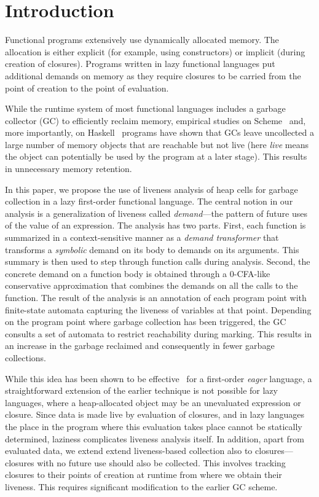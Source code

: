 \documentclass[9pt]{sigplanconf}
\begin{document}
\section{Introduction}
\label{sec:intro}

Functional programs extensively use dynamically allocated memory.  The
allocation  is either  explicit (for  example, using  constructors) or
implicit  (during creation  of  closures).  Programs  written in  lazy
functional languages put additional  demands on memory as they require
closures to  be carried  from the  point of creation  to the  point of
evaluation.

While  the runtime  system  of most  functional  languages includes  a
garbage  collector  (GC)  to  efficiently  reclaim  memory,  empirical
studies on Scheme~\cite{karkare06effectiveness} and, more importantly,
on  Haskell~\cite{rojemo96lag}  programs  have shown  that  GCs  leave
uncollected a  large number of  memory objects that are  reachable but
not live (here {\em live} means  the object can potentially be used by
the program  at a  later stage).  This  results in  unnecessary memory
retention.

In this paper,  we propose the use of liveness  analysis of heap cells
for garbage collection in a lazy first-order functional language.  The
central notion in our analysis  is a generalization of liveness called
{\em  demand}---the  pattern  of  future  uses  of  the  value  of  an
expression.   The analysis  has two  parts.  First,  each function  is
summarized in a context-sensitive manner as a {\em demand transformer}
that transforms a {\em symbolic} demand  on its body to demands on its
arguments.  This summary  is then used to step  through function calls
during analysis.   Second, the concrete  demand on a function  body is
obtained through a 0-CFA-like conservative approximation that combines
the  demands on  all the  calls to  the function.   The result  of the
analysis  is an  annotation of  each program  point with  finite-state
automata capturing the liveness of  variables at that point. Depending
on the program point where  garbage collection has been triggered, the
GC consults a set of  automata to restrict reachability during marking.
This results in an increase  in the garbage reclaimed and consequently
in fewer garbage collections.

While this idea has been shown to be effective~\cite{asati14lgc} for a
first-order {\em  eager} language, a straightforward  extension of the
earlier  technique  is  not  possible  for  lazy  languages,  where  a
heap-allocated   object   may   be  an   unevaluated   expression   or
closure. Since  data is made  live by  evaluation of closures,  and in
lazy languages  the place in  the program where this  evaluation takes
place cannot  be statically determined, laziness  complicates liveness
analysis itself.   In addition, apart  from evaluated data,  we extend
extend liveness-based  collection also to closures---closures  with no
future use should also be  collected.  This involves tracking closures
to their  points of  creation at  runtime from  where we  obtain their
liveness.  This  requires significant  modification to the  earlier GC
scheme.  
\end{document}
